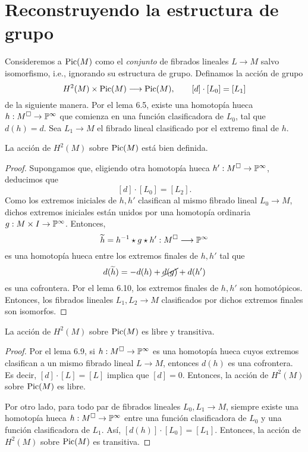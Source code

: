 \section{Reconstruyendo la estructura de grupo}

Consideremos a $\Pic(M)$ como el \textit{conjunto} de fibrados lineales $L \to M$ salvo isomorfismo, i.e., ignorando su estructura de grupo. Definamos la acción de grupo
$$H^2(M) \times \Pic(M) \longrightarrow \Pic(M), \qquad [d] \cdot [L_0] = [L_1]$$
de la siguiente manera. Por el lema 6.5, existe una homotopía hueca $h : M^\square \to \P^\infty$ que comienza en una función clasificadora de $L_0$, tal que $d(h) = d$. Sea $L_1 \to M$ el fibrado lineal clasificado por el extremo final de $h$.

\begin{proposition}
La acción de $H^2(M)$ sobre $\Pic(M)$ está bien definida.
\end{proposition}

\begin{proof}
Supongamos que, eligiendo otra homotopía hueca $h' : M^\square \to \P^\infty$, deducimos que
$$[d] \cdot [L_0] = [L_2].$$
Como los extremos iniciales de $h, h'$ clasifican al mismo fibrado lineal $L_0 \to M$, dichos extremos iniciales están unidos por una homotopía ordinaria $g : M \times I \to \P^\infty$. Entonces,
$$\widetilde h = h^{-1} \star g \star h' : M^\square \longrightarrow \P^\infty$$
es una homotopía hueca entre los extremos finales de $h, h'$ tal que
$$d(\widetilde h) = -d(h) + \cancel {d(g)} + d(h')$$
es una cofrontera. Por el lema 6.10, los extremos finales de $h, h'$ son homotópicos. Entonces, los fibrados lineales $L_1, L_2 \to M$ clasificados por dichos extremos finales son isomorfos.
\end{proof}

\begin{proposition}
La acción de $H^2(M)$ sobre $\Pic(M)$ es libre y transitiva.
\end{proposition}

\begin{proof}
Por el lema 6.9, si $h : M^\square \to \P^\infty$ es una homotopía hueca cuyos extremos clasifican a un mismo fibrado lineal $L \to M$, entonces $d(h)$ es una cofrontera. Es decir, $[d] \cdot [L] = [L]$ implica que $[d] = 0$. Entonces, la acción de $H^2(M)$ sobre $\Pic(M)$ es libre.

Por otro lado, para todo par de fibrados lineales $L_0, L_1 \to M$, siempre existe una homotopía hueca $h : M^\square \to \P^\infty$ entre una función clasificadora de $L_0$ y una función clasificadora de $L_1$. Así, $[d(h)] \cdot [L_0] = [L_1]$. Entonces, la acción de $H^2(M)$ sobre $\Pic(M)$ es transitiva.
\end{proof}

